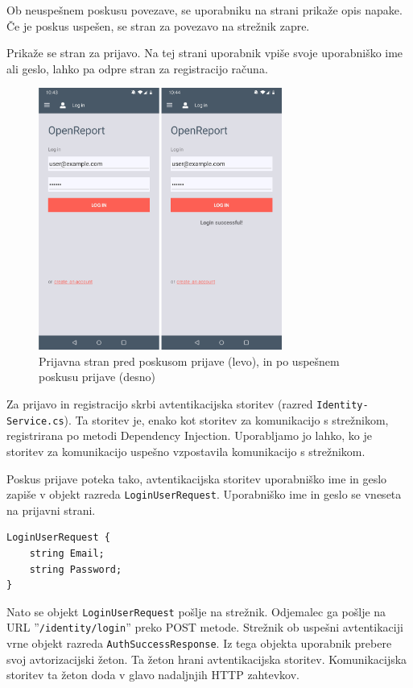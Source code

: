 \documentclass[a4paper, 12pt]{book}
\begin{document}
Ob neuspešnem poskusu povezave, se uporabniku na strani prikaže opis napake.
Če je poskus uspešen, se stran za povezavo na strežnik zapre.

Prikaže se stran za prijavo.
Na tej strani uporabnik vpiše svoje uporabniško ime ali geslo, lahko pa odpre stran za registracijo računa.

\begin{figure}[H]
\begin{center}
\includegraphics[width=8cm]{app_login}
\end{center}
	\caption{Prijavna stran pred poskusom prijave (levo), in po uspešnem poskusu prijave (desno)}
\label{app_login}
\end{figure}


Za prijavo in registracijo skrbi avtentikacijska storitev (razred \texttt{Identity-\\Service.cs}).
Ta storitev je, enako kot storitev za komunikacijo s strežnikom, registrirana po metodi Dependency Injection.
Uporabljamo jo lahko, ko je storitev za komunikacijo uspešno vzpostavila komunikacijo s strežnikom.

Poskus prijave poteka tako, avtentikacijska storitev uporabniško ime in geslo zapiše v objekt razreda \texttt{LoginUserRequest}.
Uporabniško ime in geslo se vneseta na prijavni strani.

\begin{Verbatim}[commandchars=+\[\]]
LoginUserRequest {
    string Email; 
    string Password;
}
\end{Verbatim}

Nato se objekt \texttt{LoginUserRequest} pošlje na strežnik.
Odjemalec ga pošlje na URL ''\texttt{/identity/login}'' preko POST metode.
Strežnik ob uspešni avtentikaciji vrne objekt razreda \texttt{AuthSuccessResponse}.
Iz tega objekta uporabnik prebere svoj avtorizacijski žeton.
Ta žeton hrani avtentikacijska storitev.
Komunikacijska storitev ta žeton doda v glavo nadaljnjih HTTP zahtevkov.
\end{document}
